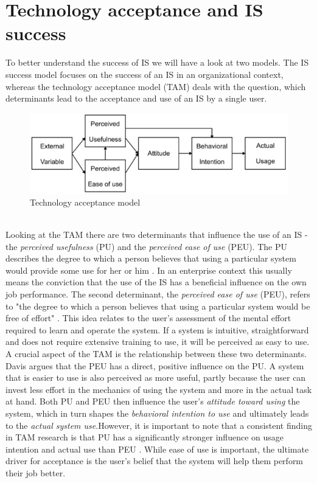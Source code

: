 \documentclass[
	english,
	ruledheaders=section,%
	class=report,%
	thesis={type=bachelor},%
	accentcolor=1b,%
	custommargins=true,%
	marginpar=false,%
	parskip=half-,%
	fontsize=11pt,%
	DIV=14,
]{tudapub}
\begin{document}
\section{Technology acceptance and IS success}
To better understand the success of IS we will have a look at two models. The IS success model \parencite{DeloneMcLean2003ISSuccessTenYearUpdate} focuses on the success of an IS in an organizational context, whereas the technology acceptance model (TAM) deals with the question, which determinants lead to the acceptance and use of an IS by a single user.
\begin{figure}[h!]
    \includegraphics[width=1\linewidth]{images/TAM.png}
    \caption{Technology acceptance model}
    \label{fig:enter-label}
\end{figure}
\\
Looking at the TAM there are two determinants that influence the use of an IS - the \textit{perceived usefulness} (PU) and the \textit{perceived ease of use} (PEU). The PU describes the degree to which a person believes that using a particular system would provide some use for her or him \parencite{Davis1989MISQ}. In an enterprise context this usually means the conviction that the use of the IS has a beneficial influence on the own job performance. The second determinant, the \textit{perceived ease of use} (PEU), refers to "the degree to which a person believes that using a particular system would be free of effort" \parencite[p.~320]{Davis1989MISQ}. This idea relates to the user's assessment of the mental effort required to learn and operate the system. If a system is intuitive, straightforward and does not require extensive training to use, it will be perceived as easy to use.\\ A crucial aspect of the TAM is the relationship between these two determinants. Davis argues that the PEU has a direct, positive influence on the PU. A system that is easier to use is also perceived as more useful, partly because the user can invest less effort in the mechanics of using the system and more in the actual task at hand. Both PU and PEU then influence the user's \textit{attitude toward using} the system, which in turn shapes the \textit{behavioral intention to use} and ultimately leads to the \textit{actual system use}.However, it is important to note that a consistent finding in TAM research is that PU has a significantly stronger influence on usage intention and actual use than PEU \parencite{Davis1989MISQ}. While ease of use is important, the ultimate driver for acceptance is the user's belief that the system will help them perform their job better.\\
\end{document}
